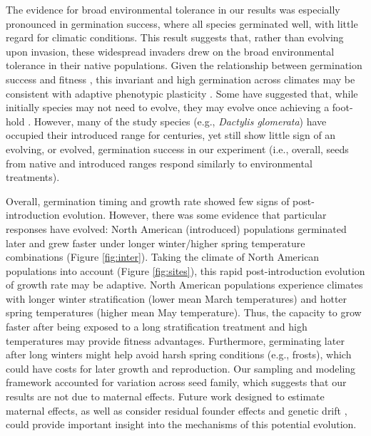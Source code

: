 \documentclass[11pt]{article}\usepackage[]{graphicx}\usepackage[]{color}
\begin{document}
	The evidence for broad environmental tolerance in our results was especially pronounced in germination success, where all species germinated well, with little regard for climatic conditions. This result suggests that, rather than evolving upon invasion, these widespread invaders drew on the broad environmental tolerance in their native populations. Given the relationship between germination success and fitness \parencite[e.g.,][]{Domic2020}, this invariant and high germination across climates may be consistent with adaptive phenotypic plasticity \parencite{Baker1965}. Some have suggested that, while initially species may not need to evolve, they may evolve once achieving a foot-hold \parencite{Lamarque2015}. However, many of the study species (e.g., \textit{Dactylis glomerata}) have occupied their introduced range for centuries, yet still show little sign of an evolving, or evolved, germination success in our experiment (i.e., overall, seeds from native and introduced ranges respond similarly to environmental treatments).  

	Overall, germination timing and growth rate showed few signs of post-introduction evolution. However, there was some evidence that particular responses have evolved: North American (introduced) populations germinated later and grew faster under longer winter/higher spring temperature combinations (Figure \ref{fig:inter}). Taking the climate of North American populations into account (Figure \ref{fig:sites}), this rapid post-introduction evolution of growth rate may be adaptive. North American populations experience climates with longer winter stratification (lower mean March temperatures) and hotter spring temperatures (higher mean May temperature). Thus, the capacity to grow faster after being exposed to a long stratification treatment and high temperatures may provide fitness advantages. Furthermore, germinating later after long winters might help avoid harsh spring conditions (e.g., frosts), which could have costs for later growth and reproduction. Our sampling and modeling framework accounted for variation across seed family, which suggests that our results are not due to maternal effects. Future work designed to estimate maternal effects, as well as consider residual founder effects \parencite{Shirk2014} and genetic drift \parencite{Eckert1996}, could provide important insight into the mechanisms of this potential evolution. %
\end{document}
